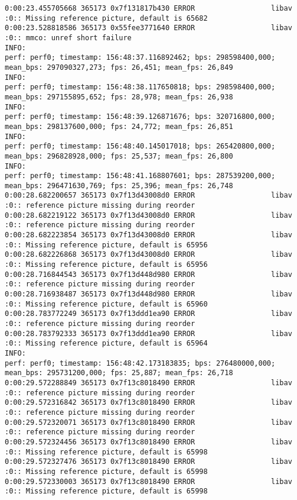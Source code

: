 \documentclass[12pt,oneside]{book}
\begin{document}
\begin{lstlisting}
0:00:23.455705668 365173 0x7f131817b430 ERROR                  libav :0:: Missing reference picture, default is 65682
0:00:23.528818586 365173 0x55fee3771640 ERROR                  libav :0:: mmco: unref short failure
INFO:
perf: perf0; timestamp: 156:48:37.116892462; bps: 298598400,000; mean_bps: 297090327,273; fps: 26,451; mean_fps: 26,849
INFO:
perf: perf0; timestamp: 156:48:38.117650818; bps: 298598400,000; mean_bps: 297155895,652; fps: 28,978; mean_fps: 26,938
INFO:
perf: perf0; timestamp: 156:48:39.126871676; bps: 320716800,000; mean_bps: 298137600,000; fps: 24,772; mean_fps: 26,851
INFO:
perf: perf0; timestamp: 156:48:40.145017018; bps: 265420800,000; mean_bps: 296828928,000; fps: 25,537; mean_fps: 26,800
INFO:
perf: perf0; timestamp: 156:48:41.168807601; bps: 287539200,000; mean_bps: 296471630,769; fps: 25,396; mean_fps: 26,748
0:00:28.682200657 365173 0x7f13d43008d0 ERROR                  libav :0:: reference picture missing during reorder
0:00:28.682219122 365173 0x7f13d43008d0 ERROR                  libav :0:: reference picture missing during reorder
0:00:28.682223854 365173 0x7f13d43008d0 ERROR                  libav :0:: Missing reference picture, default is 65956
0:00:28.682226868 365173 0x7f13d43008d0 ERROR                  libav :0:: Missing reference picture, default is 65956
0:00:28.716844543 365173 0x7f13d448d980 ERROR                  libav :0:: reference picture missing during reorder
0:00:28.716938487 365173 0x7f13d448d980 ERROR                  libav :0:: Missing reference picture, default is 65960
0:00:28.783772249 365173 0x7f13ddd1ea90 ERROR                  libav :0:: reference picture missing during reorder
0:00:28.783792333 365173 0x7f13ddd1ea90 ERROR                  libav :0:: Missing reference picture, default is 65964
INFO:
perf: perf0; timestamp: 156:48:42.173183835; bps: 276480000,000; mean_bps: 295731200,000; fps: 25,887; mean_fps: 26,718
0:00:29.572288849 365173 0x7f13c8018490 ERROR                  libav :0:: reference picture missing during reorder
0:00:29.572316842 365173 0x7f13c8018490 ERROR                  libav :0:: reference picture missing during reorder
0:00:29.572320071 365173 0x7f13c8018490 ERROR                  libav :0:: reference picture missing during reorder
0:00:29.572324456 365173 0x7f13c8018490 ERROR                  libav :0:: Missing reference picture, default is 65998
0:00:29.572327476 365173 0x7f13c8018490 ERROR                  libav :0:: Missing reference picture, default is 65998
0:00:29.572330003 365173 0x7f13c8018490 ERROR                  libav :0:: Missing reference picture, default is 65998

\end{lstlisting}
\end{document}
